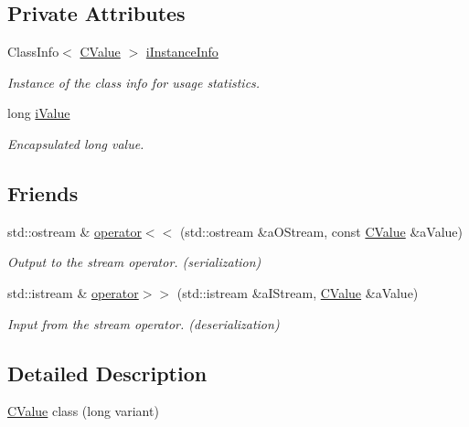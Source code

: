 \subsection*{Private Attributes}
\begin{DoxyCompactItemize}
\item 
Class\+Info$<$ \hyperlink{class_c_value__long_1_1_c_value}{C\+Value} $>$ \hyperlink{class_c_value__long_1_1_c_value_a8fe601f5ab7c00ed6438775489b1b139}{i\+Instance\+Info}
\begin{DoxyCompactList}\small\item\em Instance of the class info for usage statistics. \end{DoxyCompactList}\item 
long \hyperlink{class_c_value__long_1_1_c_value_a64fa282dcd9e69e0cf70ed07c5558d11}{i\+Value}
\begin{DoxyCompactList}\small\item\em Encapsulated {\ttfamily long} value. \end{DoxyCompactList}\end{DoxyCompactItemize}
\subsection*{Friends}
\begin{DoxyCompactItemize}
\item 
std\+::ostream \& \hyperlink{class_c_value__long_1_1_c_value_a3d28097fae6bdd5a8146d9ab90f8b62f}{operator$<$$<$} (std\+::ostream \&a\+O\+Stream, const \hyperlink{class_c_value__long_1_1_c_value}{C\+Value} \&a\+Value)
\begin{DoxyCompactList}\small\item\em Output to the stream operator. ({\itshape serialization}) \end{DoxyCompactList}\item 
std\+::istream \& \hyperlink{class_c_value__long_1_1_c_value_aba05045ca890e398c1211784aebbc9ed}{operator$>$$>$} (std\+::istream \&a\+I\+Stream, \hyperlink{class_c_value__long_1_1_c_value}{C\+Value} \&a\+Value)
\begin{DoxyCompactList}\small\item\em Input from the stream operator. ({\itshape deserialization}) \end{DoxyCompactList}\end{DoxyCompactItemize}


\subsection{Detailed Description}
\hyperlink{class_c_value__long_1_1_c_value}{C\+Value} class ({\ttfamily long} variant) 

